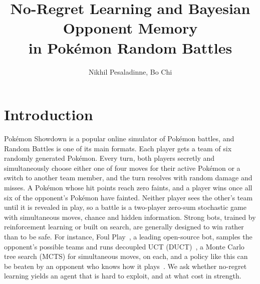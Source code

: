 \documentclass[10pt]{article}
\title{No-Regret Learning and Bayesian Opponent Memory\\in Pok\'emon Random Battles}
\author{Nikhil Pesaladinne, Bo Chi}
\theoremstyle{tplain}
\theoremstyle{tdef}
\theoremstyle{trem}
\newcommand{\Hbar}{\bar H}
\newcommand{\epss}{\varepsilon_s}
\newcommand{\epsv}{\varepsilon_v}
\begin{document}
\maketitle\maketitlenow


\section{Introduction}
\label{sec:intro}
Pok\'emon Showdown is a popular online simulator of Pok\'emon battles, and Random Battles is one of its main formats. Each player gets a team of six randomly generated Pok\'emon. Every turn, both players secretly and simultaneously choose either one of four moves for their active Pok\'emon or a switch to another team member, and the turn resolves with random damage and misses. A Pok\'emon whose hit points reach zero faints, and a player wins once all six of the opponent's Pok\'emon have fainted. Neither player sees the other's team until it is revealed in play, so a battle is a two-player zero-sum stochastic game with simultaneous moves, chance and hidden information. Strong bots, trained by reinforcement learning or built on search, are generally designed to win rather than to be safe. For instance, Foul Play~\cite{foulplay}, a leading open-source bot, samples the opponent's possible teams and runs decoupled UCT (DUCT)~\cite{Tak14}, a Monte Carlo tree search (MCTS) for simultaneous moves, on each, and a policy like this can be beaten by an opponent who knows how it plays~\cite{Yu26}. We ask whether no-regret learning yields an agent that is hard to exploit, and at what cost in strength.
\end{document}
